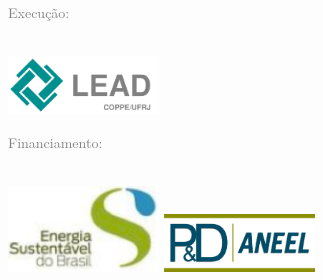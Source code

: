 





\thispagestyle{empty}


\hypersetup{pageanchor=false}

\vspace{4cm}

 \textcolor{gray}{Execução:} \\
\\
\begin{minipage}{\textwidth}
	\centering
       
	\includegraphics[width=0.3\textwidth]{figs/logo/lead-logo}
	
\end{minipage}

\vspace{2cm}

\textcolor{gray}{Financiamento: } \\ 
\\
\begin{minipage}{\textwidth}
	\centering
	
	\includegraphics[width=0.3\textwidth]{figs/logo/esbr-logo}
	\includegraphics[width=0.3\textwidth]{figs/logo/aneel-logo}

	
\end{minipage}

